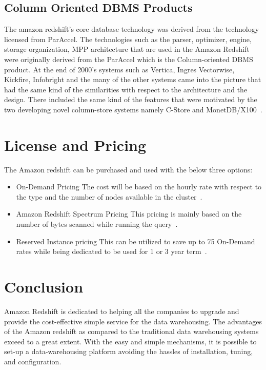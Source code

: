 	\subsection{Column Oriented DBMS Products}
	The amazon redshift’s core database technology was derived from the 
	technology licensed from ParAccel. The technologies such as the parser, 
	optimizer, engine, storage organization, MPP architecture that are 
	used in the Amazon Redshift were originally derived from the ParAccel 
	which is the Column-oriented DBMS product. At the end of 2000’s systems 
	such as Vertica, Ingres Vectorwise, Kickfire, Infobright and the 
	many of the other systems came into the picture that had the 
	same kind of the similarities with respect to the architecture and 
	the design. There included the same kind of the features that 
	were motivated by the two developing novel column-store 
	systems namely C-Store 
	and MonetDB/X100~\cite{hid-sp18-412_Gupta_2015_ARC}.

\section{License and Pricing}
\label{s:license}

	The Amazon redshift can be purchased and used with 
	the below three options:
	
	\begin{itemize}
	
	\item On-Demand Pricing 
	The cost will be based on the hourly rate with respect to 
	the type and the 
	number of nodes available 
	in the cluster~\cite{hid-sp18-412-Amazon_Redshift_Pricing}.
	
	\item Amazon Redshift Spectrum Pricing
	This pricing is mainly based on the number of bytes 
	scanned while running 
	the query~\cite{hid-sp18-412-Amazon_Redshift_Pricing}.
	
	\item Reserved Instance pricing
	This can be utilized to save up to 75%
	On-Demand rates while being dedicated to 
	be used for 
	1 or 3 year term~\cite{hid-sp18-412-Amazon_Redshift_Pricing}.
	
	\end{itemize}

\section{Conclusion}
\label{s:conclusion}
	Amazon Redshift is dedicated to helping all the 
	companies to upgrade and provide the cost-effective simple 
	service for the data warehousing. The advantages of the Amazon 
	redshift as compared to the traditional 
	data warehousing systems exceed to a great extent. With the easy and 
	simple mechanisms, it is possible to set-up a data-warehousing platform 
	avoiding the hassles of installation, tuning, and configuration.
    
